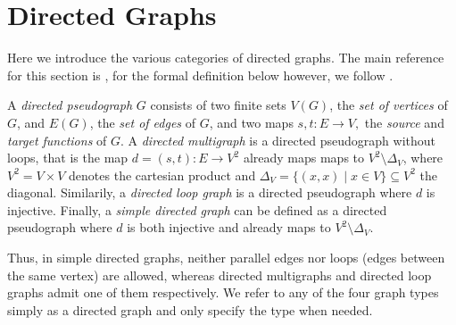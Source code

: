 




\section{Directed Graphs}\label{sec:directed_graphs}


Here we introduce the various categories of directed graphs. The main
reference for this section is \textcite{Bang-Jensen_Digraphs}, for the
formal definition below however, we
follow \textcite{nLab}.

\begin{definition}
    
   
  \label{def:directed_graphs}  
  A \textit{directed pseudograph} $G$ consists  of two finite
 sets
  $V(G)$, the \textit{set of vertices}  of $G$, and $E(G)$, the \textit{set of
    edges} of $G$, and two maps $ s,t: E \to V, $ the \textit{source}
  and \textit{target functions} of $G$. A \textit{directed multigraph}
  is a directed pseudograph without loops, that is the map $d =
  (s,t):E \to V^2$ already maps maps to $V^2\setminus\Delta_V$, where
  $V^2 = V \times V$ denotes the cartesian product and $\Delta_V =
  \{(x,x) \mid x \in V\} \subseteq V^2$ the diagonal. Similarily, a
  \textit{directed loop graph} is a directed pseudograph where $d$ is
  injective. Finally, a \textit{simple directed graph} can be defined
  as a directed pseudograph where $d$ is both injective and already
  maps to $V^2\setminus\Delta_V$.
\end{definition}

Thus, in simple directed graphs, neither parallel edges nor loops
(edges between the same vertex) are allowed, whereas directed
multigraphs and directed loop graphs admit one of them
respectively. We refer to any of the four graph types simply as a
directed graph and only specify the type when needed.



